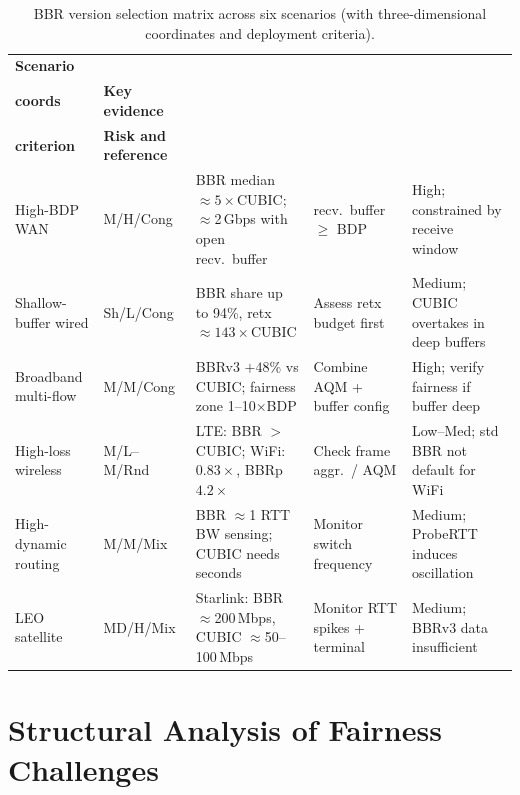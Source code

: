 \documentclass[a4paper,fleqn]{cas-sc}
\begin{document}
\begin{table}[pos=htbp]
  \caption{BBR version selection matrix across six scenarios
    (with three-dimensional coordinates and deployment criteria).}
  \label{tab:summary}
  \small
  \small
  \begin{tabularx}{\tblwidth}{@{}p{2.0cm}p{1.5cm}Xp{2.0cm}X@{}}
    \toprule
    \textbf{Scenario} & \makecell[l]{\textbf{3-D}\\\textbf{coords}} & \textbf{Key evidence}
      & \makecell[l]{\textbf{Deployment}\\\textbf{criterion}} & \textbf{Risk and reference} \\
    \midrule
    High-BDP WAN & M/H/Cong & BBR median $\approx\!5\times$CUBIC; $\approx$2\,Gbps with open recv.\ buffer &
      recv.\ buffer $\geq$ BDP & High; constrained by receive window~\citep{cardwell2017bbr} \\
    \midrule
    Shallow-buffer wired & Sh/L/Cong & BBR share up to 94\%, retx $\approx\!143\times$CUBIC &
      Assess retx budget first & Medium; CUBIC overtakes in deep buffers~\citep{cao2019bbr,jaeger2019bbr} \\
    \midrule
    Broadband multi-flow & M/M/Cong & BBRv3 $+48\%$ vs CUBIC; fairness zone 1--10$\times$BDP &
      Combine AQM + buffer config & High; verify fairness if buffer deep~\citep{gomez2024bbrv3} \\
    \midrule
    High-loss wireless & M/L--M/Rnd & LTE: BBR $>$ CUBIC; WiFi: $0.83\times$, BBRp $4.2\times$ &
      Check frame aggr.\ / AQM & Low--Med; std BBR not default for WiFi~\citep{atxutegi2018cellular,grazia2020bbrp} \\
    \midrule
    High-dynamic routing & M/M/Mix & BBR $\approx$1 RTT BW sensing; CUBIC needs seconds &
      Monitor switch frequency & Medium; ProbeRTT induces oscillation~\citep{miyazawa2018cyclic} \\
    \midrule
    LEO satellite & MD/H/Mix & Starlink: BBR $\approx$200\,Mbps, CUBIC $\approx$50--100\,Mbps &
      Monitor RTT spikes + terminal & Medium; BBRv3 data insufficient~\citep{deutschmann2023starlink,kamel2024starquic} \\
    \bottomrule
  \end{tabularx}
\end{table}

\FloatBarrier

\section{Structural Analysis of Fairness Challenges}
\label{sec:fairness}
\end{document}
